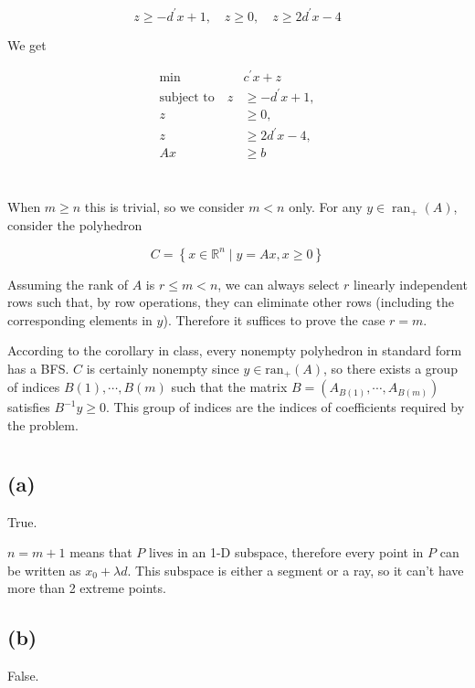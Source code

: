 \documentclass{article}
\newcommand{\1}{\bm 1}
\begin{document}
\[ z \geq - d^{'}x + 1, \quad z \geq 0, \quad z \geq 2d^{'}x - 4 \]

We get

\begin{align*}
    \min \quad & c^{'}x + z\\
    \text{subject to} \quad z & \geq - d^{'}x + 1,\\
    z & \geq 0,\\
    z & \geq 2d^{'}x - 4, \\
    Ax & \geq b
\end{align*}


\section{}

When $m\ge n$ this is trivial, so we consider $m < n$ only. For any $y\in\operatorname{ran}_+(A)$, consider the polyhedron

$$
C=\left\{x \in \mathbb{R}^{n} \mid y=A x, x \geq 0\right\}
$$

Assuming the rank of $A$ is $r\le m<n$, we can always select $r$ linearly independent rows such that, by row operations, they can eliminate other rows (including the corresponding elements in $y$). Therefore it suffices to prove the case $r=m$.

According to the corollary in class, every nonempty polyhedron in standard form has a BFS. $C$ is certainly nonempty since $y\in\textrm{ran}_+(A)$, so there exists a group of indices $B(1), \cdots, B(m)$ such that the matrix $B=(A_{B(1)}, \cdots, A_{B(m)})$ satisfies $B^{-1}y\ge 0$. This group of indices are the indices of coefficients required by the problem.


\section{}

\subsection*{(a)} 

True.

$n = m+1$ means that $P$ lives in an 1-D subspace, therefore every point in $P$ can be written as $x_0 + \lambda d$. This subspace is either a segment or a ray, so it can't have more than 2 extreme points.

\subsection*{(b)}
False.
\end{document}
